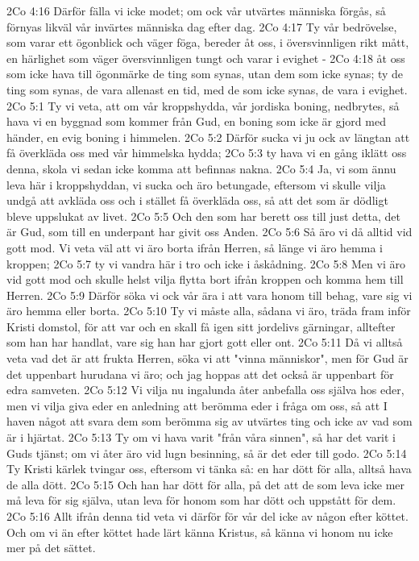 2Co 4:16  Därför fälla vi icke modet; om ock vår utvärtes människa förgås, så förnyas likväl vår invärtes människa dag efter dag.
2Co 4:17  Ty vår bedrövelse, som varar ett ögonblick och väger föga, bereder åt oss, i översvinnligen rikt mått, en härlighet som väger översvinnligen tungt och varar i evighet -
2Co 4:18  åt oss som icke hava till ögonmärke de ting som synas, utan dem som icke synas; ty de ting som synas, de vara allenast en tid, med de som icke synas, de vara i evighet.
2Co 5:1  Ty vi veta, att om vår kroppshydda, vår jordiska boning, nedbrytes, så hava vi en byggnad som kommer från Gud, en boning som icke är gjord med händer, en evig boning i himmelen.
2Co 5:2  Därför sucka vi ju ock av längtan att få överkläda oss med vår himmelska hydda;
2Co 5:3  ty hava vi en gång iklätt oss denna, skola vi sedan icke komma att befinnas nakna.
2Co 5:4  Ja, vi som ännu leva här i kroppshyddan, vi sucka och äro betungade, eftersom vi skulle vilja undgå att avkläda oss och i stället få överkläda oss, så att det som är dödligt bleve uppslukat av livet.
2Co 5:5  Och den som har berett oss till just detta, det är Gud, som till en underpant har givit oss Anden.
2Co 5:6  Så äro vi då alltid vid gott mod. Vi veta väl att vi äro borta ifrån Herren, så länge vi äro hemma i kroppen;
2Co 5:7  ty vi vandra här i tro och icke i åskådning.
2Co 5:8  Men vi äro vid gott mod och skulle helst vilja flytta bort ifrån kroppen och komma hem till Herren.
2Co 5:9  Därför söka vi ock vår ära i att vara honom till behag, vare sig vi äro hemma eller borta.
2Co 5:10  Ty vi måste alla, sådana vi äro, träda fram inför Kristi domstol, för att var och en skall få igen sitt jordelivs gärningar, alltefter som han har handlat, vare sig han har gjort gott eller ont.
2Co 5:11  Då vi alltså veta vad det är att frukta Herren, söka vi att "vinna människor", men för Gud är det uppenbart hurudana vi äro; och jag hoppas att det också är uppenbart för edra samveten.
2Co 5:12  Vi vilja nu ingalunda åter anbefalla oss själva hos eder, men vi vilja giva eder en anledning att berömma eder i fråga om oss, så att I haven något att svara dem som berömma sig av utvärtes ting och icke av vad som är i hjärtat.
2Co 5:13  Ty om vi hava varit "från våra sinnen", så har det varit i Guds tjänst; om vi åter äro vid lugn besinning, så är det eder till godo.
2Co 5:14  Ty Kristi kärlek tvingar oss, eftersom vi tänka så: en har dött för alla, alltså hava de alla dött.
2Co 5:15  Och han har dött för alla, på det att de som leva icke mer må leva för sig själva, utan leva för honom som har dött och uppstått för dem.
2Co 5:16  Allt ifrån denna tid veta vi därför för vår del icke av någon efter köttet. Och om vi än efter köttet hade lärt känna Kristus, så känna vi honom nu icke mer på det sättet.
